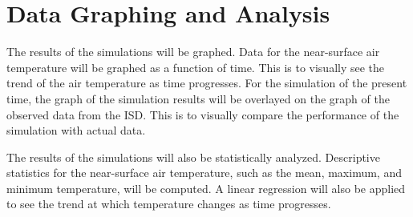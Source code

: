 \section{Data Graphing and Analysis}
	The results of the simulations will be graphed.
	Data for the near-surface air temperature will be graphed as a function of time.
	This is to visually see the trend of the air temperature as time progresses.
	For the simulation of the present time, the graph of the simulation results will be overlayed on the graph of the observed data from the ISD.
	This is to visually compare the performance of the simulation with actual data.
	
	The results of the simulations will also be statistically analyzed.
	Descriptive statistics for the near-surface air temperature, such as the mean, maximum, and minimum temperature, will be computed.
	A linear regression will also be applied to see the trend at which temperature changes as time progresses.